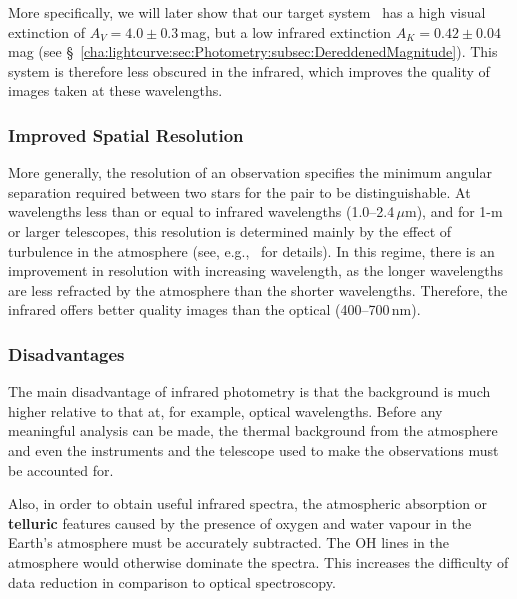 \vspace{\myparskip}

More specifically, we will later show that our target system \groj\ has a high visual extinction of $A_{V} =4.0\pm0.3$\,mag, but a low infrared extinction $A_{K} = 0.42\pm0.04$\,mag (see \S~\vref{cha:lightcurve:sec:Photometry:subsec:DereddenedMagnitude}). This system is therefore
less obscured in the infrared, which improves the quality of images taken at these wavelengths. %


\subsubsection{Improved Spatial Resolution}
\label{cha:InfraredDataReductionTechniques:sec:InfraredAstronomy:subsubsec:ImprovedResolution}

More generally, the resolution of an observation specifies the minimum angular
separation required between two stars for the pair to be
distinguishable. At wavelengths less than or equal to infrared wavelengths
(1.0--2.4$\,\mu \mathrm{m}$), and for 1-m or larger telescopes, this
resolution is determined mainly by the effect of turbulence in the
atmosphere (see, e.g., %
%
\ for details). In this regime, there is an improvement in resolution
with increasing wavelength, as the longer wavelengths are less
refracted by the atmosphere than the shorter wavelengths. Therefore,
the infrared offers better quality images than the optical
(400--700\,nm). %


\subsubsection{Disadvantages}
\label{cha:InfraredDataReductionTechniques:sec:InfraredAstronomy:subsubsec:Disadvantages}

The main disadvantage of infrared photometry is that the background
is much higher relative to that at, for example, optical
wavelengths. Before any meaningful analysis can be made, the thermal
background from the atmosphere and even the instruments and the telescope used to
make the observations must be accounted for.

\vspace{\myparskip}

Also, in order to obtain useful infrared spectra, the
atmospheric absorption or \textbf{telluric} features caused by the presence of oxygen and water vapour in the
Earth's atmosphere must be accurately subtracted. The OH lines in the
atmosphere would otherwise dominate the spectra. This increases the
difficulty of data reduction in comparison to optical spectroscopy. %

